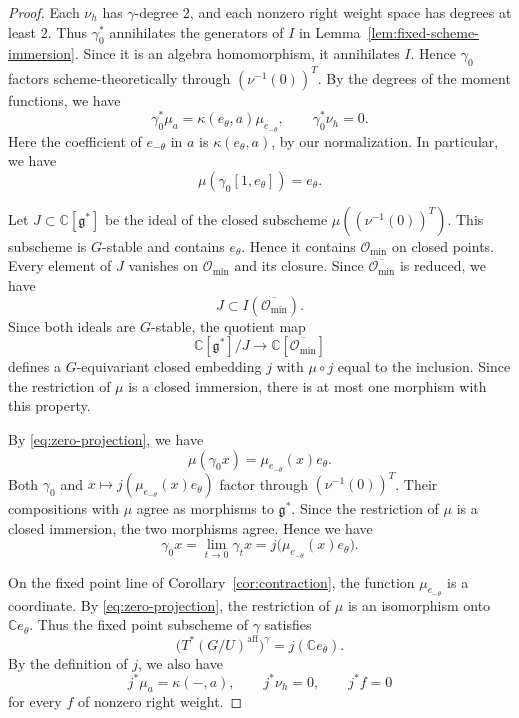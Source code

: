 \documentclass[12pt]{article}
\theoremstyle{paperplain}
\theoremstyle{paperdefinition}
\newcommand{\C}{\mathbb C}
\newcommand{\Omin}{\mathcal O_{\min}}
\newcommand{\g}{\mathfrak g}
\begin{document}
\begin{proof}
    Each $\nu_h$ has $\gamma$-degree $2$, and each nonzero right weight space has degrees at least $2$. Thus $\gamma_0^*$ annihilates the generators of $I$ in Lemma~\ref{lem:fixed-scheme-immersion}. Since it is an algebra homomorphism, it annihilates $I$. Hence $\gamma_0$ factors scheme-theoretically through $(\nu^{-1}(0))^T$. By the degrees of the moment functions, we have
    \begin{equation}\label{eq:zero-projection}
        \gamma_0^*\mu_a=\kappa(e_\theta,a)\mu_{e_{-\theta}},
        \qquad \gamma_0^*\nu_h=0.
    \end{equation}
    Here the coefficient of $e_{-\theta}$ in $a$ is $\kappa(e_\theta,a)$, by our normalization. In particular, we have
    $$
        \mu(\gamma_0[1,e_\theta])=e_\theta.
    $$

    Let $J\subset\C[\g^*]$ be the ideal of the closed subscheme $\mu((\nu^{-1}(0))^T)$. This subscheme is $G$-stable and contains $e_\theta$. Hence it contains $\Omin$ on closed points. Every element of $J$ vanishes on $\Omin$ and its closure. Since $\overline{\Omin}$ is reduced, we have
    $$
        J\subset I(\overline{\Omin}).
    $$
    Since both ideals are $G$-stable, the quotient map
    $$
        \C[\g^*]/J\longrightarrow\C[\overline{\Omin}]
    $$
    defines a $G$-equivariant closed embedding $j$ with $\mu\circ j$ equal to the inclusion. Since the restriction of $\mu$ is a closed immersion, there is at most one morphism with this property.

    By \eqref{eq:zero-projection}, we have
    $$
        \mu(\gamma_0x)=\mu_{e_{-\theta}}(x)e_\theta.
    $$
    Both $\gamma_0$ and $x\mapsto j(\mu_{e_{-\theta}}(x)e_\theta)$ factor through $(\nu^{-1}(0))^T$. Their compositions with $\mu$ agree as morphisms to $\g^*$. Since the restriction of $\mu$ is a closed immersion, the two morphisms agree. Hence we have
    \begin{equation}\label{eq:limit}
        \gamma_0x=\lim_{t\to0}\gamma_t x
        =j\bigl(\mu_{e_{-\theta}}(x)e_\theta\bigr).
    \end{equation}

    On the fixed point line of Corollary~\ref{cor:contraction}, the function $\mu_{e_{-\theta}}$ is a coordinate. By \eqref{eq:zero-projection}, the restriction of $\mu$ is an isomorphism onto $\C e_\theta$. Thus the fixed point subscheme of $\gamma$ satisfies
    $$
        \bigl(T^*(G/U)^{\mathrm{aff}}\bigr)^\gamma=j(\C e_\theta).
    $$
    By the definition of $j$, we also have
    \begin{equation}\label{eq:embedding-functions}
        j^*\mu_a=\kappa(-,a),\qquad
        j^*\nu_h=0,\qquad j^*f=0
    \end{equation}
    for every $f$ of nonzero right weight.
\end{proof}
\end{document}
